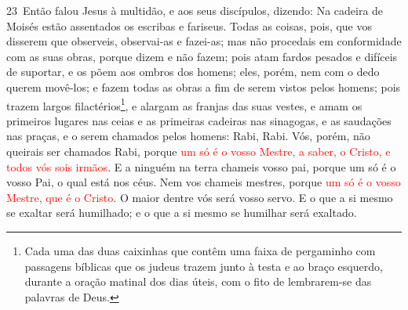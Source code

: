 \lettrine{23}\ Então falou Jesus à multidão, e aos seus
discípulos, dizendo: Na cadeira de Moisés estão assentados os
escribas e fariseus. Todas as coisas, pois, que vos disserem que
observeis, observai-as e fazei-as; mas não procedais em conformidade
com as suas obras, porque dizem e não fazem; pois atam fardos
pesados e difíceis de suportar, e os põem aos ombros dos homens;
eles, porém, nem com o dedo querem movê-los; e fazem todas as
obras a fim de serem vistos pelos homens; pois trazem largos
filactérios\footnote{Cada uma das duas caixinhas que contêm uma
faixa de pergaminho com passagens bíblicas que os judeus trazem
junto à testa e ao braço esquerdo, durante a oração matinal dos dias
úteis, com o fito de lembrarem-se das palavras de Deus.}, e alargam
as franjas das suas vestes, e amam os primeiros lugares nas
ceias e as primeiras cadeiras nas sinagogas, e as saudações nas
praças, e o serem chamados pelos homens: Rabi, Rabi. Vós, porém,
não queirais ser chamados Rabi, porque \textcolor{red}{um só é o vosso
Mestre, a saber, o Cristo, e todos vós sois irmãos}. E a ninguém
na terra chameis vosso pai, porque um só é o vosso Pai, o qual está
nos céus. Nem vos chameis mestres, porque \textcolor{red}{um só é o
vosso Mestre, que é o Cristo}. O maior dentre vós será vosso
servo. E o que a si mesmo se exaltar será humilhado; e o que
a si mesmo se humilhar será exaltado.

